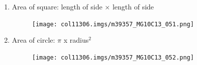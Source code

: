 \begin{enumerate}[noitemsep, label=\textbf{\arabic*}. ]
\begin{figure}[H]
\begin{center}
    \end{center}

 \end{figure}   

    \addtocounter{footnote}{-0}
    \label{m39357*uid102}\item Area of square: length of side $\ensuremath{\times}$ length of side

    \setcounter{subfigure}{0}


	\begin{figure}[H] %
    \begin{center}
    \label{m39357*id319903!!!underscore!!!media}\label{m39357*id319903!!!underscore!!!printimage}\texttt{[image: col11306.imgs/m39357\_MG10C13\_051.png]} %
        
      \vspace{2pt}
    \vspace{.1in}
    
    \end{center}

 \end{figure}   

    \addtocounter{footnote}{-0}
    \label{m39357*uid103}\item Area of circle: $\pi $ x radius\begin{math}{}^{2}\end{math}
    \setcounter{subfigure}{0}


	\begin{figure}[H] %
    \begin{center}
    \label{m39357*id319945!!!underscore!!!media}\label{m39357*id319945!!!underscore!!!printimage}\texttt{[image: col11306.imgs/m39357\_MG10C13\_052.png]} %
        
      \vspace{2pt}
    \vspace{.1in}
    
    \end{center}

 \end{figure}   

    \addtocounter{footnote}{-0}
    \end{enumerate}
        
\label{m39357*eip-964}
    \setcounter{subfigure}{0}


